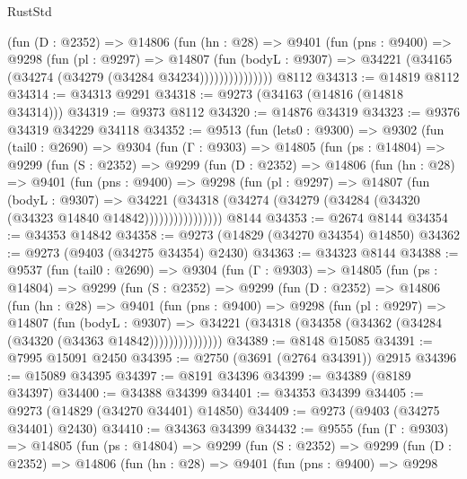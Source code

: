 \begin{lexlean}{RustStd}
\begin{coremodule}
                (fun (D : @2352) =>
                @14806
                  (fun (hn : @28) =>
                  @9401
                    (fun (pns : @9400) =>
                    @9298
                      (fun (pl : @9297) =>
                      @14807
                        (fun (bodyL : @9307) =>
                        @34221 (@34165 (@34274 (@34279 (@34284 @34234)))))))))))))))
    @8112
@34313 := @14819 @8112
@34314 := @34313 @9291
@34318 := @9273 (@34163 (@14816 (@14818 @34314)))
@34319 := @9373 @8112
@34320 := @14876 @34319
@34323 := @9376 @34319 @34229 @34118
@34352 := @9513
    (fun (lets0 : @9300) =>
    @9302
      (fun (tail0 : @2690) =>
      @9304
        (fun (Γ : @9303) =>
        @14805
          (fun (ps : @14804) =>
          @9299
            (fun (S : @2352) =>
            @9299
              (fun (D : @2352) =>
              @14806
                (fun (hn : @28) =>
                @9401
                  (fun (pns : @9400) =>
                  @9298
                    (fun (pl : @9297) =>
                    @14807
                      (fun (bodyL : @9307) =>
                      @34221
                        (@34318
                          (@34274 (@34279 (@34284 (@34320 (@34323 @14840 @14842))))))))))))))))
    @8144
@34353 := @2674 @8144
@34354 := @34353 @14842
@34358 := @9273 (@14829 (@34270 @34354) @14850)
@34362 := @9273 (@9403 (@34275 @34354) @2430)
@34363 := @34323 @8144
@34388 := @9537
    (fun (tail0 : @2690) =>
    @9304
      (fun (Γ : @9303) =>
      @14805
        (fun (ps : @14804) =>
        @9299
          (fun (S : @2352) =>
          @9299
            (fun (D : @2352) =>
            @14806
              (fun (hn : @28) =>
              @9401
                (fun (pns : @9400) =>
                @9298
                  (fun (pl : @9297) =>
                  @14807
                    (fun (bodyL : @9307) =>
                    @34221 (@34318 (@34358 (@34362 (@34284 (@34320 (@34363 @14842)))))))))))))))
@34389 := @8148 @15085
@34391 := @7995 @15091 @2450
@34395 := @2750 (@3691 (@2764 @34391)) @2915
@34396 := @15089 @34395
@34397 := @8191 @34396
@34399 := @34389 (@8189 @34397)
@34400 := @34388 @34399
@34401 := @34353 @34399
@34405 := @9273 (@14829 (@34270 @34401) @14850)
@34409 := @9273 (@9403 (@34275 @34401) @2430)
@34410 := @34363 @34399
@34432 := @9555
    (fun (Γ : @9303) =>
    @14805
      (fun (ps : @14804) =>
      @9299
        (fun (S : @2352) =>
        @9299
          (fun (D : @2352) =>
          @14806
            (fun (hn : @28) =>
            @9401
              (fun (pns : @9400) =>
              @9298

\end{coremodule}
\end{lexlean}
